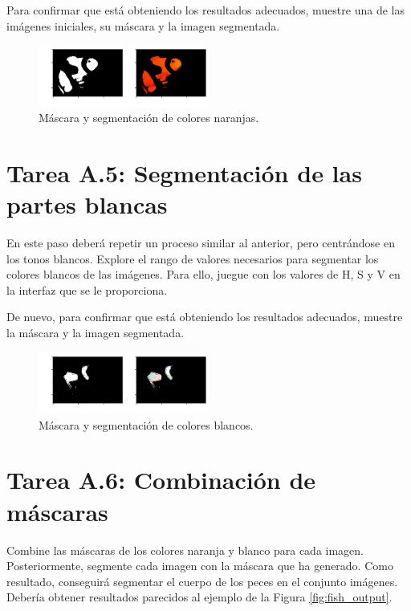 Para confirmar que está obteniendo los resultados adecuados, muestre una de las imágenes iniciales, su máscara y la imagen segmentada.


\begin{figure}[h]
    \centering
    \includegraphics[width=0.5\textwidth]{Lab_2/template/figures/orange.png}
    \caption{Máscara y segmentación de colores naranjas.}
    \label{fig:orange_mask}
\end{figure}

\section*{Tarea A.5: Segmentación de las partes blancas}

En este paso deberá repetir un proceso similar al anterior, pero centrándose en los tonos blancos. Explore el rango de valores necesarios para segmentar los colores blancos de las imágenes. Para ello, juegue con los valores de H, S y V en la interfaz que se le proporciona.

De nuevo, para confirmar que está obteniendo los resultados adecuados, muestre la máscara y la imagen segmentada.

\begin{figure}[h]
    \centering
    \includegraphics[width=0.5\textwidth]{Lab_2/template/figures/white.png}
    \caption{Máscara y segmentación de colores blancos.}
    \label{fig:whithe_mask}
\end{figure}

\section*{Tarea A.6: Combinación de máscaras}

Combine las máscaras de los colores naranja y blanco para cada imagen. Posteriormente, segmente cada imagen con la máscara que ha generado. Como resultado, conseguirá segmentar el cuerpo de los peces en el conjunto imágenes. Debería obtener resultados parecidos al ejemplo de la Figura \ref{fig:fish_output}.

